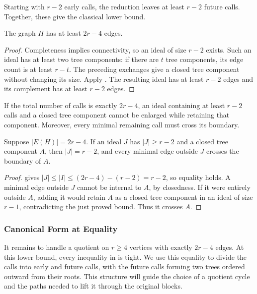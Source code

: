 \documentclass[USenglish, a4paper, thm-restate,numberwithinsect, cleveref]{lipics-v2021}
\begin{document}
Starting with $r-2$ early calls, the reduction leaves at least $r-2$
future calls. Together, these give the classical lower bound.

\begin{corollary}\label{cor:characterization-call-lower-bound}
The graph $H$ has at least $2r-4$ edges.
\end{corollary}
\begin{proof}
Completeness implies connectivity, so an ideal of size $r-2$ exists.
Such an ideal has at least two tree components: if there are $t$
tree components, its edge count is at least $r-t$.
The preceding exchanges give a closed tree component without changing
its size. Apply . The resulting
ideal has at least $r-2$ edges and its complement has at least $r-2$
edges.
\end{proof}

If the total number of calls is exactly $2r-4$, an ideal containing
at least $r-2$ calls and a closed tree component cannot be enlarged
while retaining that component. Moreover, every minimal remaining
call must cross its boundary.

\begin{corollary}
\label{lem:characterization-closed-tree-saturated}
Suppose $|E(H)|=2r-4$. If an ideal $J$ has $|J|\ge r-2$ and a
closed tree component $A$, then $|J|=r-2$, and every minimal edge
outside $J$ crosses the boundary of $A$.
\end{corollary}
\begin{proof}
 gives
$|J|\le|I|\le(2r-4)-(r-2)=r-2$, so equality holds.
A minimal edge outside $J$ cannot be internal to $A$, by closedness.
If it were entirely outside $A$, adding it would retain $A$ as a
closed tree component in an ideal of size $r-1$, contradicting the
just proved bound. Thus it crosses $A$.
\end{proof}


\subsubsection{Canonical Form at Equality}
It remains to handle a quotient on $r\geq4$ vertices with exactly
$2r-4$ edges. At this lower bound, every inequality in
 is tight. We use this
equality to divide the calls into early and future calls, with the
future calls forming two trees ordered outward from their roots.
This structure will guide the choice of a quotient cycle and the
paths needed to lift it through the original blocks.
\end{document}
